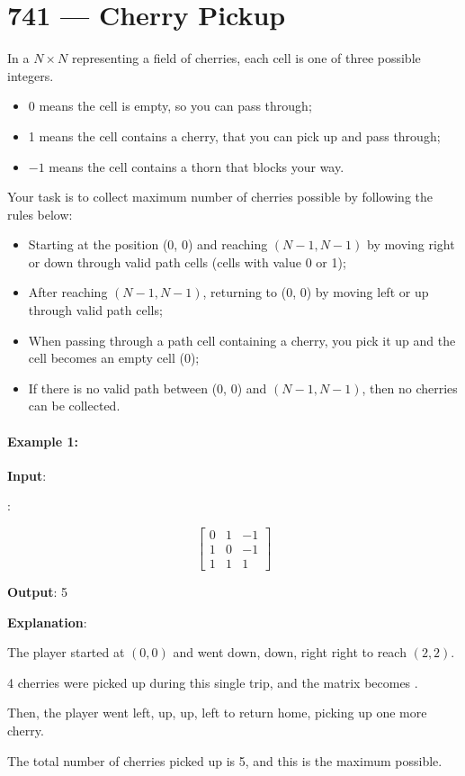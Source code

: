 \section{741 --- Cherry Pickup}
In a $N \times N$  representing a field of cherries, each cell is one of three possible integers.

\begin{itemize}
\item 0 means the cell is empty, so you can pass through;
\item 1 means the cell contains a cherry, that you can pick up and pass through;
\item $-1$ means the cell contains a thorn that blocks your way.
\end{itemize}

Your task is to collect maximum number of cherries possible by following the rules below:
\begin{itemize}
\item Starting at the position (0, 0) and reaching $(N-1, N-1)$ by moving right or down through valid path cells (cells with value 0 or 1);
\item After reaching $(N-1, N-1)$, returning to (0, 0) by moving left or up through valid path cells;
\item When passing through a path cell containing a cherry, you pick it up and the cell becomes an empty cell (0); 
\item If there is no valid path between (0, 0) and $(N-1, N-1)$, then no cherries can be collected.
\end{itemize} 


\paragraph{Example 1:}
\begin{flushleft}


\textbf{Input}: 

:

\[
\begin{bmatrix}
0 & 1 & -1 \\
1 & 0 & -1 \\
1 & 1 &  1 
\end{bmatrix}
\]

\textbf{Output}: 5

\textbf{Explanation}: 

The player started at $ (0, 0) $ and went down, down, right right to reach $ (2, 2) $.

4 cherries were picked up during this single trip, and the matrix becomes \fcj{[[0,1,-1],[0,0,-1],[0,0,0]]}.

Then, the player went left, up, up, left to return home, picking up one more cherry.

The total number of cherries picked up is 5, and this is the maximum possible.
\end{flushleft}

